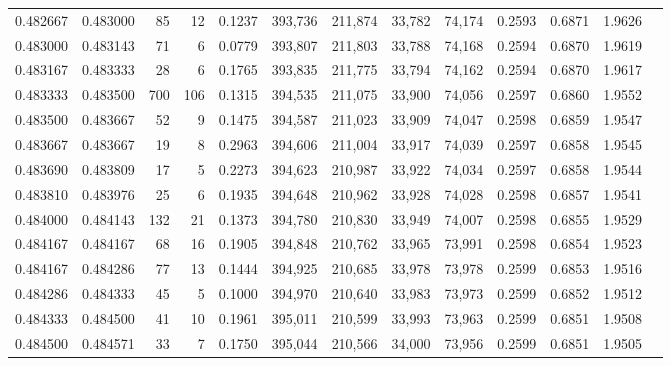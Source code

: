 \begin{tabular}{rrrrrrrrrrrrr}
0.482667 & 0.483000 &    85 &  12 &                                     0.1237 & 393,736 & 211,874 &  33,782 &  74,174 & 0.2593 & 0.6871 & 1.9626 \\
0.483000 & 0.483143 &    71 &   6 &                                     0.0779 & 393,807 & 211,803 &  33,788 &  74,168 & 0.2594 & 0.6870 & 1.9619 \\
0.483167 & 0.483333 &    28 &   6 &                                     0.1765 & 393,835 & 211,775 &  33,794 &  74,162 & 0.2594 & 0.6870 & 1.9617 \\
0.483333 & 0.483500 &   700 & 106 &                                     0.1315 & 394,535 & 211,075 &  33,900 &  74,056 & 0.2597 & 0.6860 & 1.9552 \\
0.483500 & 0.483667 &    52 &   9 &                                     0.1475 & 394,587 & 211,023 &  33,909 &  74,047 & 0.2598 & 0.6859 & 1.9547 \\
0.483667 & 0.483667 &    19 &   8 &                                     0.2963 & 394,606 & 211,004 &  33,917 &  74,039 & 0.2597 & 0.6858 & 1.9545 \\
0.483690 & 0.483809 &    17 &   5 &                                     0.2273 & 394,623 & 210,987 &  33,922 &  74,034 & 0.2597 & 0.6858 & 1.9544 \\
0.483810 & 0.483976 &    25 &   6 &                                     0.1935 & 394,648 & 210,962 &  33,928 &  74,028 & 0.2598 & 0.6857 & 1.9541 \\
0.484000 & 0.484143 &   132 &  21 &                                     0.1373 & 394,780 & 210,830 &  33,949 &  74,007 & 0.2598 & 0.6855 & 1.9529 \\
0.484167 & 0.484167 &    68 &  16 &                                     0.1905 & 394,848 & 210,762 &  33,965 &  73,991 & 0.2598 & 0.6854 & 1.9523 \\
0.484167 & 0.484286 &    77 &  13 &                                     0.1444 & 394,925 & 210,685 &  33,978 &  73,978 & 0.2599 & 0.6853 & 1.9516 \\
0.484286 & 0.484333 &    45 &   5 &                                     0.1000 & 394,970 & 210,640 &  33,983 &  73,973 & 0.2599 & 0.6852 & 1.9512 \\
0.484333 & 0.484500 &    41 &  10 &                                     0.1961 & 395,011 & 210,599 &  33,993 &  73,963 & 0.2599 & 0.6851 & 1.9508 \\
0.484500 & 0.484571 &    33 &   7 &                                     0.1750 & 395,044 & 210,566 &  34,000 &  73,956 & 0.2599 & 0.6851 & 1.9505 \\

\end{tabular}
